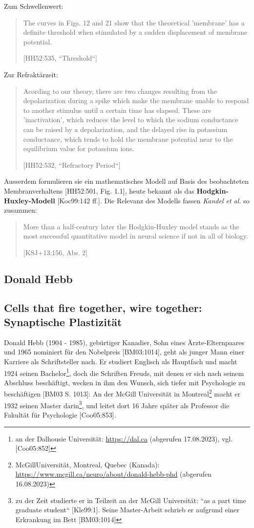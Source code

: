Zum Schwellenwert:
\blockquote[{[HH52:535, ``Threshold``]}]{
    The curves in Figs. 12 and 21 show that the theoretical 'membrane' has a definite threshold when stimulated by a sudden displacement of membrane potential.
}

Zur Refraktärzeit:
\blockquote[{[HH52:532, ``Refractory Period``]}]{
    Acording to our theory, there are two changes resulting from the depolarization during a spike which make the membrane unable to respond to another stimulus until a certain time has elapsed. These are 'inactivation', which reduces the level to which the sodium conductance can be raised by a depolarization, and the delayed rise in potassium conductance, which tends to hold the membrane potential near to the equilibrium value for potassium ions.
}

Ausserdem formulieren sie ein mathematisches Modell auf Basis des beobachteten Membranverhaltens [HH52:501, Fig. 1.1], heute bekannt als das \textbf{Hodgkin-Huxley-Modell} [Koc99:142 ff.].
 Die Relevanz des Modells fassen \textit{Kandel et al.} so zusammen:

\blockquote[{[KSJ+13:156, Abs. 2]}]{
    More than a half-century later the Hodgkin-Huxley model stands as the most successful quantitative model in neural science if not in all of biology.
}

\subsection{Donald Hebb}\label{appendix:hebb}
\subsection*{Cells that fire together, wire together: Synaptische Plastizität}

Donald Hebb (1904 - 1985), gebürtiger Kanadier, Sohn eines Ärzte-Elternpaares und 1965 nominiert für den Nobelpreis [BM03:1014], geht als junger Mann einer Karriere als Schriftsteller nach.
Er studiert Englisch als Hauptfach und macht 1924 seinen Bachelor\footnote{
    an der Dalhousie Universität: \url{https://dal.ca} (abgerufen 17.08.2023), vgl. [Coo05:852]
}, doch die Schriften Freuds, mit denen er sich nach seinem Abschluss beschäftigt, wecken in ihm den Wunsch, sich tiefer mit Psychologie zu beschäftigen [BM03 S. 1013]: An der McGill Universität in Montreal\footnote{
    McGillUniversität, Montreal, Quebec (Kanada): \url{https://www.mcgill.ca/neuro/about/donald-hebb-phd} (abgerufen 16.08.2023)
} macht er 1932 seinen Master darin\footnote{
    zu der Zeit studierte er in Teilzeit an der McGill Universität: ``as a part time graduate student`` [Kle99:1]. Seine Master-Arbeit schrieb er aufgrund einer Erkrankung im Bett [BM03:1014]
}, und leitet dort 16 Jahre später als Professor die Fakultät für Psychologie [Coo05:853].

